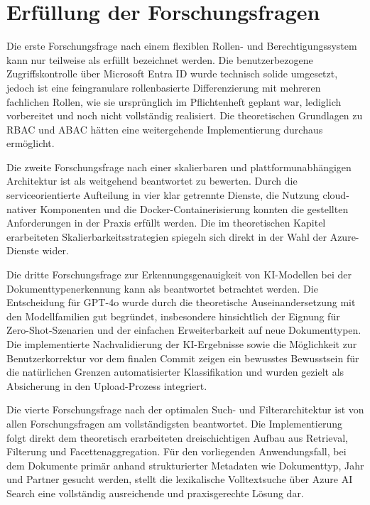 \section{Erfüllung der Forschungsfragen}

Die erste Forschungsfrage nach einem flexiblen Rollen- und Berechtigungssystem kann nur teilweise als erfüllt bezeichnet werden. Die benutzerbezogene Zugriffskontrolle über Microsoft Entra ID wurde technisch solide umgesetzt, jedoch ist eine feingranulare rollenbasierte Differenzierung mit mehreren fachlichen Rollen, wie sie ursprünglich im Pflichtenheft geplant war, lediglich vorbereitet und noch nicht vollständig realisiert. Die theoretischen Grundlagen zu RBAC und ABAC hätten eine weitergehende Implementierung durchaus ermöglicht.

Die zweite Forschungsfrage nach einer skalierbaren und plattformunabhängigen Architektur ist als weitgehend beantwortet zu bewerten. Durch die serviceorientierte Aufteilung in vier klar getrennte Dienste, die Nutzung cloud-nativer Komponenten und die Docker-Containerisierung konnten die gestellten Anforderungen in der Praxis erfüllt werden. Die im theoretischen Kapitel erarbeiteten Skalierbarkeitsstrategien spiegeln sich direkt in der Wahl der Azure-Dienste wider.

Die dritte Forschungsfrage zur Erkennungsgenauigkeit von KI-Modellen bei der Dokumenttypenerkennung kann als beantwortet betrachtet werden. Die Entscheidung für GPT-4o wurde durch die theoretische Auseinandersetzung mit den Modellfamilien gut begründet, insbesondere hinsichtlich der Eignung für Zero-Shot-Szenarien und der einfachen Erweiterbarkeit auf neue Dokumenttypen. Die implementierte Nachvalidierung der KI-Ergebnisse sowie die Möglichkeit zur Benutzerkorrektur vor dem finalen Commit zeigen ein bewusstes Bewusstsein für die natürlichen Grenzen automatisierter Klassifikation und wurden gezielt als Absicherung in den Upload-Prozess integriert.

Die vierte Forschungsfrage nach der optimalen Such- und Filterarchitektur ist von allen Forschungsfragen am vollständigsten beantwortet. Die Implementierung folgt direkt dem theoretisch erarbeiteten dreischichtigen Aufbau aus Retrieval, Filterung und Facettenaggregation. Für den vorliegenden Anwendungsfall, bei dem Dokumente primär anhand strukturierter Metadaten wie Dokumenttyp, Jahr und Partner gesucht werden, stellt die lexikalische Volltextsuche über Azure AI Search eine vollständig ausreichende und praxisgerechte Lösung dar.